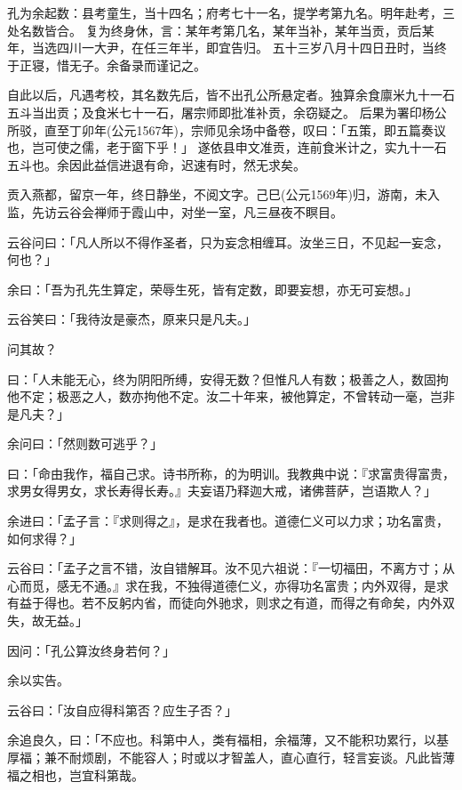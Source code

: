\documentclass[12pt,twoside,openany]{book}
\begin{document}
孔为余起数：县考童生，当十四名；府考七十一名，提学考第九名。明年赴考，三处名数皆合。
复为终身休，言：某年考第几名，某年当补，某年当贡，贡后某年，当选四川一大尹，在任三年半，即宜告归。
五十三岁八月十四日丑时，当终于正寝，惜无子。余备录而谨记之。

自此以后，凡遇考校，其名数先后，皆不出孔公所悬定者。独算余食廪米九十一石五斗当出贡；及食米七十一石，屠宗师即批准补贡，余窃疑之。
后果为署印杨公所驳，直至丁卯年(公元1567年)，宗师见余场中备卷，叹曰：「五策，即五篇奏议也，岂可使之儒，老于窗下乎！」
遂依县申文准贡，连前食米计之，实九十一石五斗也。余因此益信进退有命，迟速有时，然无求矣。

贡入燕都，留京一年，终日静坐，不阅文字。己巳(公元1569年)归，游南，未入监，先访云谷会禅师于霞山中，对坐一室，凡三昼夜不瞑目。

云谷问曰：「凡人所以不得作圣者，只为妄念相缠耳。汝坐三日，不见起一妄念，何也？」

余曰：「吾为孔先生算定，荣辱生死，皆有定数，即要妄想，亦无可妄想。」

云谷笑曰：「我待汝是豪杰，原来只是凡夫。」

问其故？

曰：「人未能无心，终为阴阳所缚，安得无数？但惟凡人有数；极善之人，数固拘他不定；极恶之人，数亦拘他不定。汝二十年来，被他算定，不曾转动一毫，岂非是凡夫？」

余问曰：「然则数可逃乎？」

曰：「命由我作，福自己求。诗书所称，的为明训。我教典中说：『求富贵得富贵，求男女得男女，求长寿得长寿。』夫妄语乃释迦大戒，诸佛菩萨，岂语欺人？」

余进曰：「孟子言：『求则得之』，是求在我者也。道德仁义可以力求；功名富贵，如何求得？」

云谷曰：「孟子之言不错，汝自错解耳。汝不见六祖说：『一切福田，不离方寸；从心而觅，感无不通。』求在我，不独得道德仁义，亦得功名富贵；内外双得，是求有益于得也。若不反躬内省，而徒向外驰求，则求之有道，而得之有命矣，内外双失，故无益。」

因问：「孔公算汝终身若何？」

余以实告。

云谷曰：「汝自应得科第否？应生子否？」

余追良久，曰：「不应也。科第中人，类有福相，余福薄，又不能积功累行，以基厚福；兼不耐烦剧，不能容人；时或以才智盖人，直心直行，轻言妄谈。凡此皆薄福之相也，岂宜科第哉。
\end{document}
